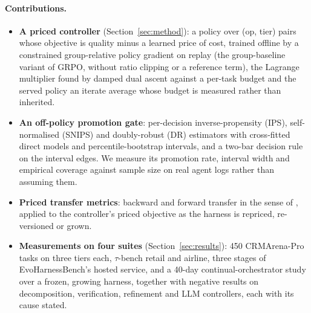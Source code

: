 \documentclass[10pt]{article}
\begin{document}
\paragraph{Contributions.}
\begin{itemize}
\item \textbf{A priced controller} (Section~\ref{sec:method}): a policy over (op, tier) pairs whose objective is quality minus a learned price of cost, trained offline by a constrained group-relative policy gradient on replay (the group-baseline variant of GRPO, without ratio clipping or a reference term), the Lagrange multiplier found by damped dual ascent against a per-task budget and the served policy an iterate average whose budget is measured rather than inherited.
\item \textbf{An off-policy promotion gate}: per-decision inverse-propensity (IPS), self-normalised (SNIPS) and doubly-robust (DR) estimators with cross-fitted direct models and percentile-bootstrap intervals, and a two-bar decision rule on the interval edges. We measure its promotion rate, interval width and empirical coverage against sample size on real agent logs rather than assuming them.
\item \textbf{Priced transfer metrics}: backward and forward transfer in the sense of \citet{lopezpaz2017gem}, applied to the controller's priced objective as the harness is repriced, re-versioned or grown.
\item \textbf{Measurements on four suites} (Section~\ref{sec:results}): 450 CRMArena-Pro tasks on three tiers each, $\tau$-bench retail and airline, three stages of EvoHarnessBench's hosted service, and a 40-day continual-orchestrator study over a frozen, growing harness, together with negative results on decomposition, verification, refinement and LLM controllers, each with its cause stated.
\end{itemize}
\end{document}

